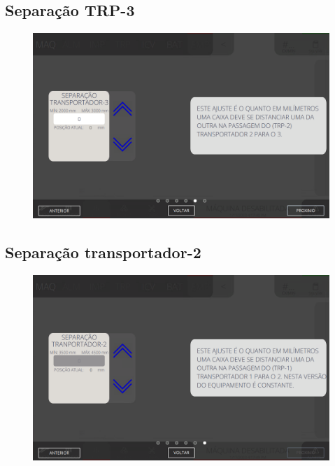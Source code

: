 \newpage
\thispagestyle{fancy}
\vspace{\fill}
\subsection{\small Separação TRP-3}
\begin{figure}
    \centering
    \includegraphics[width=576 px,height=360 px]{src/imagesICV/08-stacker/settings/5.png}
\end{figure}

\newpage
\thispagestyle{fancy}
\vspace{\fill}
\subsection{\small Separação transportador-2}
\begin{figure}
    \centering
    \includegraphics[width=576 px,height=360 px]{src/imagesICV/08-stacker/settings/6.png}
\end{figure}
